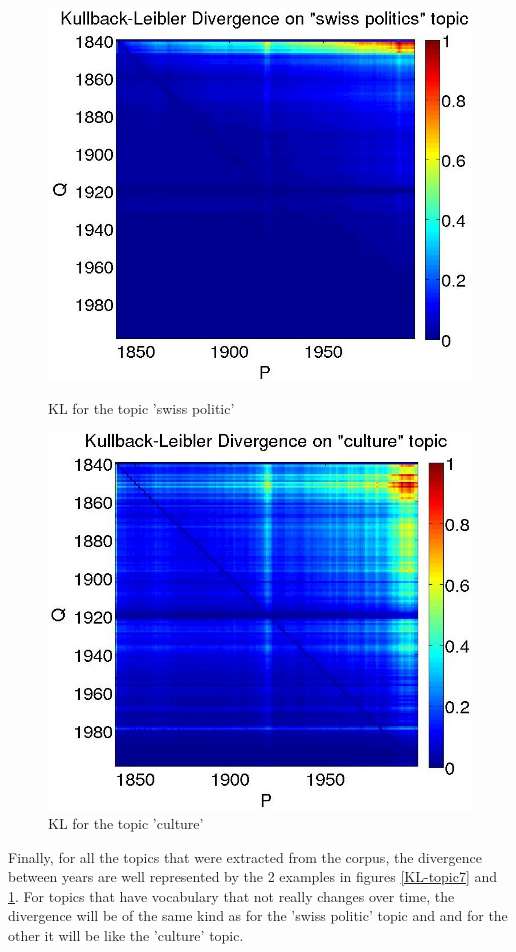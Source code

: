 \begin{figure}[H]
    \begin{minipage}[b]{0.48\linewidth}
        \includegraphics[scale=0.25]{Pictures/topics/kullback-leibler/KL_topic7.jpg}
        \caption{KL for the topic 'swiss politic'}
        \label{KL-topic7}
    \end{minipage}\hfill
    \begin{minipage}[b]{0.5\linewidth}
        \includegraphics[scale=0.25]{Pictures/topics/kullback-leibler/KL_topic1.jpg}
        \caption{KL for the topic 'culture'}
        \label{KL-topic1}
    \end{minipage}\hfill
\end{figure}

Finally, for all the topics that were extracted from the corpus, the divergence between years are well represented by the 2 examples in figures \ref{KL-topic7} and \ref{KL-topic1}. For topics that have vocabulary that not really changes over time, the divergence will be of the same kind as for the 'swiss politic' topic and and for the other it will be like the 'culture' topic.